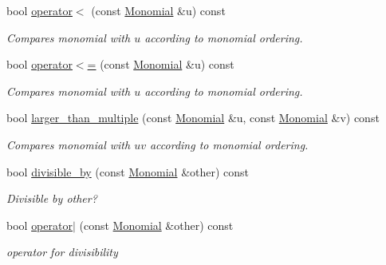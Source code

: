 \begin{Indent}
\begin{DoxyCompactItemize}
\mbox{\label{class_monomial_a6b3223572db10a2231049f449232b19e}} 
bool \hyperlink{class_monomial_a6b3223572db10a2231049f449232b19e}{operator$<$} (const \hyperlink{class_monomial}{Monomial} \&u) const
\begin{DoxyCompactList}\small\item\em Compares monomial with $u$ according to monomial ordering. \end{DoxyCompactList}\item 
\mbox{\label{class_monomial_a89124b9c5534435a9c044ac54705b8fc}} 
bool \hyperlink{class_monomial_a89124b9c5534435a9c044ac54705b8fc}{operator$<$=} (const \hyperlink{class_monomial}{Monomial} \&u) const
\begin{DoxyCompactList}\small\item\em Compares monomial with $u$ according to monomial ordering. \end{DoxyCompactList}\item 
\mbox{\label{class_monomial_a1cac303db5d3cc66247137172cf84145}} 
bool \hyperlink{class_monomial_a1cac303db5d3cc66247137172cf84145}{larger\+\_\+than\+\_\+multiple} (const \hyperlink{class_monomial}{Monomial} \&u, const \hyperlink{class_monomial}{Monomial} \&v) const
\begin{DoxyCompactList}\small\item\em Compares monomial with $uv$ according to monomial ordering. \end{DoxyCompactList}\item 
\mbox{\label{class_monomial_aa0341b299fa1fcd4459f9a6810768f0e}} 
bool \hyperlink{class_monomial_aa0341b299fa1fcd4459f9a6810768f0e}{divisible\+\_\+by} (const \hyperlink{class_monomial}{Monomial} \&other) const
\begin{DoxyCompactList}\small\item\em Divisible by {\ttfamily other}? \end{DoxyCompactList}\item 
\mbox{\label{class_monomial_a4673d0cabc6284ce01a08f6c9f71a646}} 
bool \hyperlink{class_monomial_a4673d0cabc6284ce01a08f6c9f71a646}{operator$\vert$} (const \hyperlink{class_monomial}{Monomial} \&other) const
\begin{DoxyCompactList}\small\item\em operator for divisibility \end{DoxyCompactList}\end{DoxyCompactItemize}
\end{Indent}
